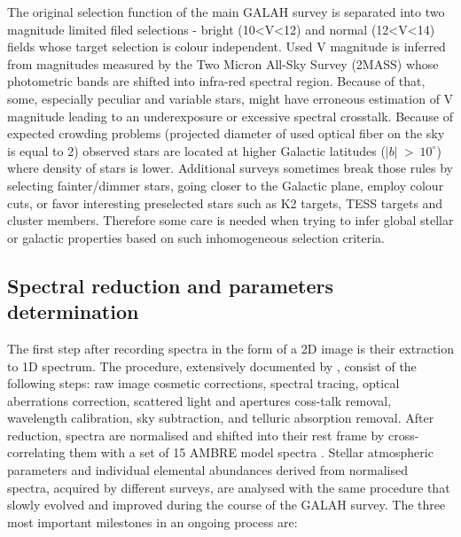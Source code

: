 The original selection function of the main GALAH survey is separated into two magnitude limited filed selections - bright (10<V<12) and normal (12<V<14) fields whose target selection is colour independent. Used V magnitude is inferred from magnitudes measured by the Two Micron All-Sky Survey (2MASS) \citep{2006AJ....131.1163S} whose photometric bands are shifted into infra-red spectral region. Because of that, some, especially peculiar and variable stars, might have erroneous estimation of V magnitude leading to an underexposure or excessive spectral crosstalk. Because of expected crowding problems (projected diameter of used optical fiber on the sky is equal to $2$\arcsec) observed stars are located at higher Galactic latitudes ($|b|$~>~$10^\circ$) where density of stars is lower. Additional surveys sometimes break those rules by selecting fainter/dimmer stars, going closer to the Galactic plane, employ colour cuts, or favor interesting preselected stars such as K2 \citep{2014PASP..126..398H} targets, TESS \citep{2015JATIS...1a4003R} targets and cluster members. Therefore some care is needed when trying to infer global stellar or galactic properties based on such inhomogeneous selection criteria.

\subsection{Spectral reduction and parameters determination}
The first step after recording spectra in the form of a 2D image is their extraction to 1D spectrum. The procedure, extensively documented by \citet{2017MNRAS.464.1259K}, consist of the following steps: raw image cosmetic corrections, spectral tracing, optical aberrations correction, scattered light and apertures coss-talk removal, wavelength calibration, sky subtraction, and telluric absorption removal. After reduction, spectra are normalised and shifted into their rest frame by cross-correlating them with a set of 15 AMBRE model spectra \citep{2012A&A...544A.126D}. Stellar atmospheric parameters and individual elemental abundances derived from normalised spectra, acquired by different surveys, are analysed with the same procedure that slowly evolved and improved during the course of the GALAH survey. The three most important milestones in an ongoing process are:

